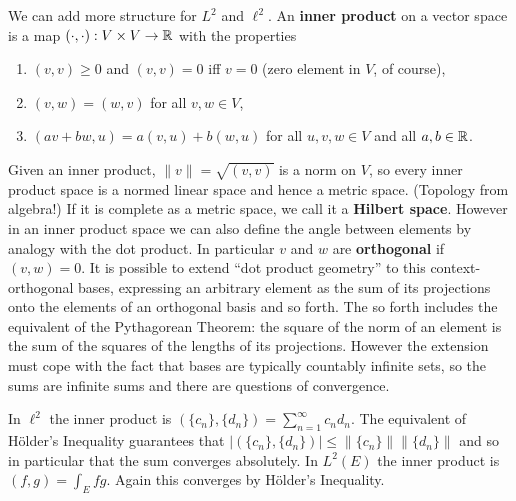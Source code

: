 \begin{rmk}%
	We can add more structure for $L^2$ and $\ell^2$. An \textbf{inner product} on a vector 
	space is a map $(\cdot , \cdot): V \times V \rightarrow \mathbb{R}$ with the properties 
	\begin{enumerate}
	\item $(v,v) \ge 0$ and $(v, v) = 0$ iff $v = 0$ (zero element in $V$, of course), 
	\item $(v,w) = (w,v)$ for all $v, w\in V$, 
	\item $(av + bw, u) = a(v,u) + b(w, u)$ for all $u, v, w \in V$ and all $a, b \in \mathbb{R}$. 
	\end{enumerate}
	Given an inner product, $\|v\| = \sqrt{(v,v)}$ is a norm on $V$, so every inner product 
	space is a normed linear space and hence a metric space. (Topology from algebra!) If it is 
	complete as a metric space, we call it a \textbf{Hilbert space}. However in an inner product 
	space we can also define the angle between elements by analogy with the dot product. In 
	particular $v$ and $w$ are \textbf{orthogonal} if $(v,w) = 0$. It is possible to extend 
	``dot product geometry'' to this context-orthogonal bases, expressing an arbitrary element 
	as the sum of its projections onto the elements of an orthogonal basis and so forth. The so 
	forth includes the equivalent of the Pythagorean Theorem: the square of the norm of an element 
	is the sum of the squares of the lengths of its projections. However the extension must 
	cope with the fact that bases are typically countably infinite sets, so the sums are infinite 
	sums and there are questions of convergence.

	In $\ell^2$ the inner product is $(\{c_n\}, \{d_n\}) = \sum\limits_{n=1}^\infty c_nd_n$. The 
	equivalent of H\"{o}lder's Inequality guarantees that $|(\{c_n\},\{d_n\})| \le \|\{c_n\}\|\|\{d_n\}\|$ 
	and so in particular that the sum converges absolutely. In $L^2(E)$ the inner product is 
	$(f,g) = \int_Efg$. Again this converges by H\"{o}lder's Inequality. 


\end{rmk}
